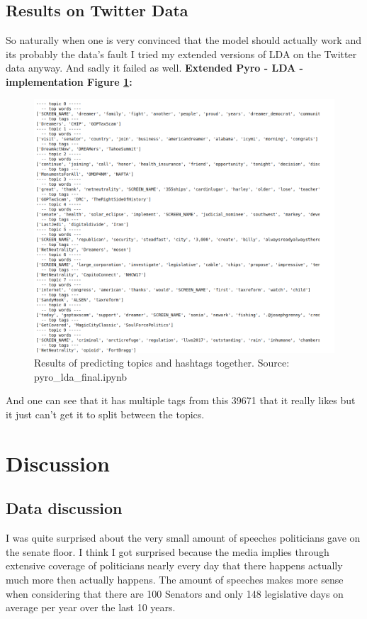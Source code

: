 \documentclass[10pt,conference,compsocconf]{IEEEtran}
\begin{document}
\subsection{Results on Twitter Data}
So naturally when one is very convinced that the model should actually work and its probably the data's fault I tried my extended versions of LDA on the Twitter data anyway. And sadly it failed as well. 
\textbf{Extended Pyro - LDA - implementation Figure \ref{fig:resultldaontwitter}:}
\begin{figure}[h]
	\centering
	\includegraphics[width=0.7\linewidth]{images/result_lda_on_twitter}
	\caption{Results of predicting topics and hashtags together. Source: pyro\_lda\_final.ipynb}
	\label{fig:resultldaontwitter}
\end{figure}
And one can see that it has multiple tags from this 39671 that it really likes but it just can't get it to split between the topics. 



\section{Discussion}
\label{sec:Discussion}

\subsection{Data discussion}

I was quite surprised about the very small amount of speeches politicians gave on the senate floor. I think I got surprised because the media implies through extensive coverage of politicians nearly every day that there happens actually much more then actually happens. The amount of speeches makes more sense when considering that there are 100 Senators and only 148 legislative days on average per year over the last 10 years.  \\
\end{document}
